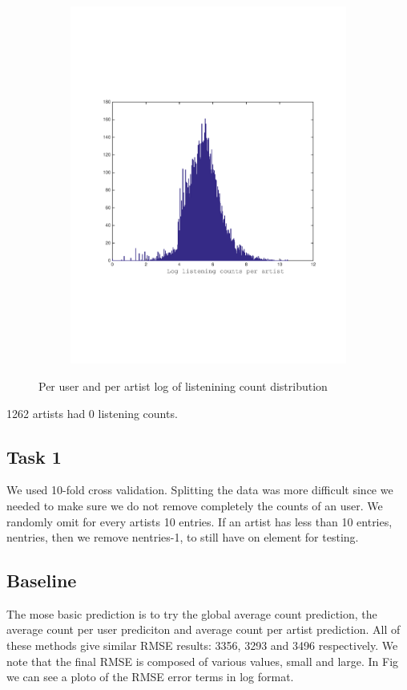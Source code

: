 \begin{figure}[h]
\begin{subfigure}[b]{0.45\textwidth}
    \includegraphics[width=\textwidth]{figures/histCountPerArtist.pdf}
    \caption{}
  \end{subfigure}
  \caption{Per user and per artist log of listenining count distribution}
  \label{fig:user_artist_distribution}
\end{figure}
1262 artists had 0 listening counts.

 
\subsection{Task 1}
We used 10-fold cross validation.
Splitting the data was  more difficult since we needed to make sure we do not
remove completely the counts of an user. We randomly omit for every artists 10 entries.
If an artist has less than 10 entries, nentries, then we remove nentries-1, to still have on element for testing.
\subsection{Baseline}
The mose basic prediction is to try the global average count prediction, the average count per user prediciton and average count
per artist prediction. All of these methods give similar RMSE results: 3356, 3293 and 3496 respectively.
We note that the final RMSE is composed of various values, small and large. In Fig we can see a ploto of the RMSE error terms in log format.

